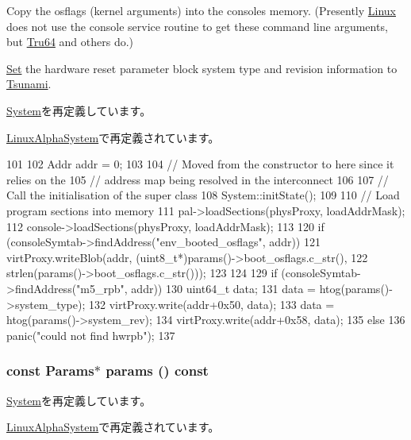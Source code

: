 Copy the osflags (kernel arguments) into the consoles memory. (Presently \hyperlink{classLinux}{Linux} does not use the console service routine to get these command line arguments, but \hyperlink{classTru64}{Tru64} and others do.)

\hyperlink{classSet}{Set} the hardware reset parameter block system type and revision information to \hyperlink{classTsunami}{Tsunami}.

\hyperlink{classSystem_a3c34ea9b29f410748d4435a667484924}{System}を再定義しています。

\hyperlink{classLinuxAlphaSystem_a3c34ea9b29f410748d4435a667484924}{LinuxAlphaSystem}で再定義されています。


\begin{DoxyCode}
101 {
102      Addr addr = 0;
103 
104     // Moved from the constructor to here since it relies on the
105     // address map being resolved in the interconnect
106 
107     // Call the initialisation of the super class
108     System::initState();
109 
110     // Load program sections into memory
111     pal->loadSections(physProxy, loadAddrMask);
112     console->loadSections(physProxy, loadAddrMask);
113 
120     if (consoleSymtab->findAddress("env_booted_osflags", addr)) {
121         virtProxy.writeBlob(addr, (uint8_t*)params()->boot_osflags.c_str(),
122                             strlen(params()->boot_osflags.c_str()));
123     }
124 
129     if (consoleSymtab->findAddress("m5_rpb", addr)) {
130         uint64_t data;
131         data = htog(params()->system_type);
132         virtProxy.write(addr+0x50, data);
133         data = htog(params()->system_rev);
134         virtProxy.write(addr+0x58, data);
135     } else
136         panic("could not find hwrpb\n");
137 }
\end{DoxyCode}
\hypertarget{classAlphaSystem_acd3c3feb78ae7a8f88fe0f110a718dff}{
\subsubsection[{params}]{\setlength{\rightskip}{0pt plus 5cm}const {\bf Params}$\ast$ params () const}}
\label{classAlphaSystem_acd3c3feb78ae7a8f88fe0f110a718dff}


\hyperlink{classSystem_acd3c3feb78ae7a8f88fe0f110a718dff}{System}を再定義しています。

\hyperlink{classLinuxAlphaSystem_acd3c3feb78ae7a8f88fe0f110a718dff}{LinuxAlphaSystem}で再定義されています。


